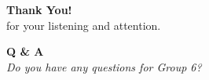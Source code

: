 \begin{frame}[plain] 
    \begin{center}
        \vspace{1.5cm}
        \Huge \textbf{Thank You!} \\
        \vspace{0.5cm}
        \Large for your listening and attention.
        
        \vspace{1.5cm}
        \LARGE \textbf{Q \& A} \\
        \vspace{0.3cm}
        \normalsize \textit{Do you have any questions for Group 6?}
    \end{center}
\end{frame}